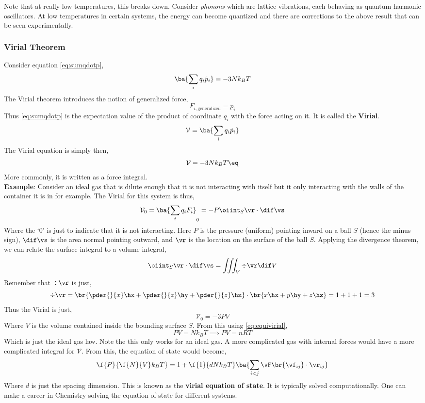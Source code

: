 \documentclass{article}
\begin{document}
{Note that at really low temperatures, this breaks down. Consider \textit{phonons} which are lattice vibrations, each behaving as quantum harmonic oscillators. At low temperatures in certain systems, the energy can become quantized and there are corrections to the above result that can be seen experimentally.

\subsubsection{Virial Theorem}

Consider equation \eqref{eq:sumqdotp},
\[ \ba{\sum_i q_i \dot{p}_i} = -3 N k_B T  \]
The Virial theorem introduces the notion of generalized force,
\[ F_{i,\text{generalized}} = \dot{p}_i \]
Thus \eqref{eq:sumqdotp} is the expectation value of the product of coordinate $q_i$ with the force acting on it. It is called the \textbf{Virial}.
\[ \mathcal{V} = \ba{\sum_i q_i \dot{p}_i} \]
The Virial equation is simply then,
\[ \mathcal{V} = -3 N k_B T \eq \label{eq:equivirial} \]
More commonly, it is written as a force integral. \\

\textbf{Example}: Consider an ideal gas that is dilute enough that it is not interacting with itself but it only interacting with the walls of the container it is in for example. The Virial for this system is thus,
\[ \mathcal{V}_0 = \ba{\sum_i q_i F_i}_0  = - P \oiint_S \vr \cdot \dif \vs\]
Where the `$0$' is just to indicate that it is not interacting. Here $P$ is the pressure (uniform) pointing inward on a ball $S$ (hence the minus sign), $\dif \vs$ is the area normal pointing outward, and $\vr$ is the location on the surface of the ball $S$. Applying the divergence theorem, we can relate the surface integral to a volume integral,
\[ \oiint_S \vr \cdot \dif \vs = \iiint_V \div \vr \dif V  \]
Remember that $\div \vr$ is just,
\[ \div \vr = \br{\pder{}{x}\hx + \pder{}{z}\hy + \pder{}{z}\hz} \cdot \br{ x \hx + y\hy + z\hz } = 1 + 1 + 1 = 3 \]
Thus the Virial is just,
\[ \mathcal{V}_0 = - 3 PV \]
Where $V$ is the volume contained inside the bounding surface $S$. From this using \eqref{eq:equivirial},
\[ PV = N k_B T  \implies PV = nRT \]
Which is just the ideal gas law. Note the this only works for an ideal gas. A more complicated gas with internal forces would have a more complicated integral for $\mathcal{V}$. From this, the equation of state would become,
\[ \f{P}{\f{N}{V} k_B T} = 1 + \f{1}{dNk_B T} \ba{\sum_{i<j} \vF\br{\vf_{ij}}\cdot \vr_{ij}}  \]
Where $d$ is just the spacing dimension. This is known as the \textbf{virial equation of state}. It is typically solved computationally. One can make a career in Chemistry solving the equation of state for different systems.

}
\end{document}
